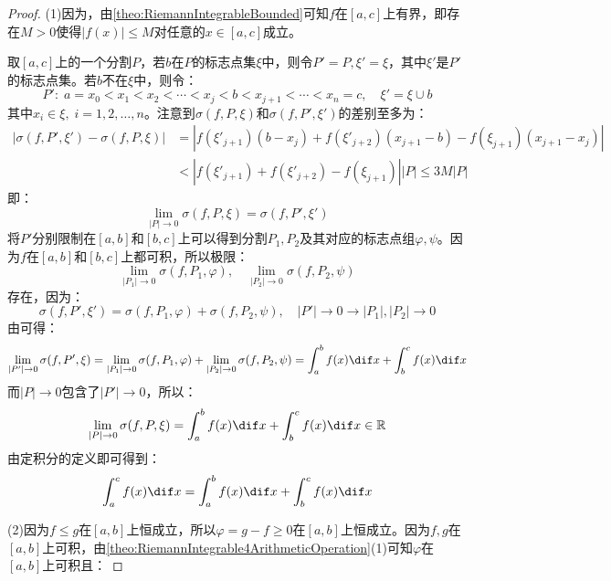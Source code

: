 \begin{proof}
	(1)因为，由\cref{theo:RiemannIntegrableBounded}可知$f$在$[a,c]$上有界，即存在$M>0$使得$|f(x)|\leqslant M$对任意的$x\in[a,c]$成立。\par
	取$[a,c]$上的一个分割$P$，若$b$在$P$的标志点集$\xi$中，则令$P'=P,\xi'=\xi$，其中$\xi'$是$P'$的标志点集。若$b$不在$\xi$中，则令：
	\begin{equation*}
		P':\;a=x_0<x_1<x_2<\cdots<x_j<b<x_{j+1}<\cdots<x_n=c,\quad \xi'=\xi\cup{b}
	\end{equation*}
	其中$x_i\in\xi,\;i=1,2,\dots,n$。注意到$\sigma(f,P,\xi)$和$\sigma(f,P',\xi')$的差别至多为：
	\begin{align*}
		|\sigma(f,P',\xi')-\sigma(f,P,\xi)|&=|f(\xi'_{j+1})(b-x_j)+f(\xi'_{j+2})(x_{j+1}-b)-f(\xi_{j+1})(x_{j+1}-x_j)| \\
		&<|f(\xi'_{j+1})+f(\xi'_{j+2})-f(\xi_{j+1})||P|\leqslant3M|P|
	\end{align*}
	即：
	\begin{equation*}
		\lim_{|P|\to0}\sigma(f,P,\xi)=\sigma(f,P',\xi')
	\end{equation*}
	将$P'$分别限制在$[a,b]$和$[b,c]$上可以得到分割$P_1,P_2$及其对应的标志点组$\varphi,\psi$。因为$f$在$[a,b]$和$[b,c]$上都可积，所以极限：
	\begin{equation*}
		\lim_{|P_1|\to0}\sigma(f,P_1,\varphi),\quad\lim_{|P_2|\to0}\sigma(f,P_2,\psi)
	\end{equation*}
	存在，因为：
	\begin{equation*}
		\sigma(f,P',\xi')=\sigma(f,P_1,\varphi)+\sigma(f,P_2,\psi),\quad|P'|\to0\longrightarrow|P_1|,|P_2|\to0
	\end{equation*}
	由可得：
	\begin{equation*}
		\lim_{|P'|\to0}\sigma(f,P',\xi)=\lim_{|P_1|\to0}\sigma(f,P_1,\varphi)+\lim_{|P_2|\to0}\sigma(f,P_2,\psi)=\int_{a}^bf(x)\dif x+\int_{b}^cf(x)\dif x
	\end{equation*}
	而$|P|\to0$包含了$|P'|\to0$，所以：
	\begin{equation*}
		\lim_{|P|\to0}\sigma(f,P,\xi)=\int_{a}^bf(x)\dif x+\int_{b}^cf(x)\dif x\in\mathbb{R}^{}
	\end{equation*}
	由定积分的定义即可得到：
	\begin{equation*}
		\int_{a}^cf(x)\dif x=\int_{a}^bf(x)\dif x+\int_{b}^cf(x)\dif x
	\end{equation*}\par
	(2)因为$f\leqslant g$在$[a,b]$上恒成立，所以$\varphi=g-f\geqslant0$在$[a,b]$上恒成立。因为$f,g$在$[a,b]$上可积，由\cref{theo:RiemannIntegrable4ArithmeticOperation}(1)可知$\varphi$在$[a,b]$上可积且：

\end{proof}
